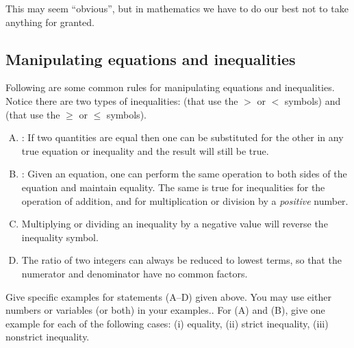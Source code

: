 \noindent
This may seem ``obvious'', but in mathematics we have to do our best not to take anything for granted.

\subsection {Manipulating equations and inequalities}\label{subsec:eqsAndIneqs}

Following are some common rules for manipulating equations and inequalities. Notice there are two types of inequalities:   (that use the $>$ or $<$ symbols) and  (that use the $\ge$ or $\le$ symbols). 

\begin {enumerate}[(A)]
\item
{}: If two quantities are equal then one can be substituted for the other in any true equation or inequality and the result will still be true. 
\item
{}: Given an equation, one can perform the same operation to both sides of the equation and maintain equality.  The same is true for inequalities for the operation of addition, and for multiplication or division by a \emph{positive} number.
\item
{}
Multiplying or dividing an inequality by a negative value will reverse the inequality symbol.
\item
{}
The ratio of two integers can always be reduced to lowest terms, so that the numerator and denominator have no common factors.
\end {enumerate}

\begin{exercise}{4}
Give specific examples for statements (A--D)   given above. You may use either numbers or variables (or both) in your examples.. For (A) and (B), give one example for each of the following cases: (i) equality, (ii) strict inequality, (iii) nonstrict inequality.
\end{exercise}

